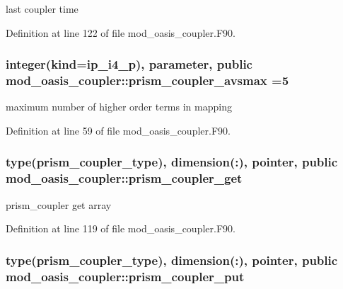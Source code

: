 last coupler time 



Definition at line 122 of file mod\+\_\+oasis\+\_\+coupler.\+F90.

\hypertarget{classmod__oasis__coupler_a6f166f099a134dffba97a168d28a3c01}{
\subsubsection[{prism\+\_\+coupler\+\_\+avsmax}]{\setlength{\rightskip}{0pt plus 5cm}integer(kind=ip\+\_\+i4\+\_\+p), parameter, public mod\+\_\+oasis\+\_\+coupler\+::prism\+\_\+coupler\+\_\+avsmax =5}}\label{classmod__oasis__coupler_a6f166f099a134dffba97a168d28a3c01}


maximum number of higher order terms in mapping 



Definition at line 59 of file mod\+\_\+oasis\+\_\+coupler.\+F90.

\hypertarget{classmod__oasis__coupler_a96df3ef2ec1b53597bb9beca43fe8349}{
\subsubsection[{prism\+\_\+coupler\+\_\+get}]{\setlength{\rightskip}{0pt plus 5cm}type({\bf prism\+\_\+coupler\+\_\+type}), dimension(\+:), pointer, public mod\+\_\+oasis\+\_\+coupler\+::prism\+\_\+coupler\+\_\+get}}\label{classmod__oasis__coupler_a96df3ef2ec1b53597bb9beca43fe8349}


prism\+\_\+coupler get array 



Definition at line 119 of file mod\+\_\+oasis\+\_\+coupler.\+F90.

\hypertarget{classmod__oasis__coupler_ae59d8823993d9ca8610efd9770393271}{
\subsubsection[{prism\+\_\+coupler\+\_\+put}]{\setlength{\rightskip}{0pt plus 5cm}type({\bf prism\+\_\+coupler\+\_\+type}), dimension(\+:), pointer, public mod\+\_\+oasis\+\_\+coupler\+::prism\+\_\+coupler\+\_\+put}}\label{classmod__oasis__coupler_ae59d8823993d9ca8610efd9770393271}



